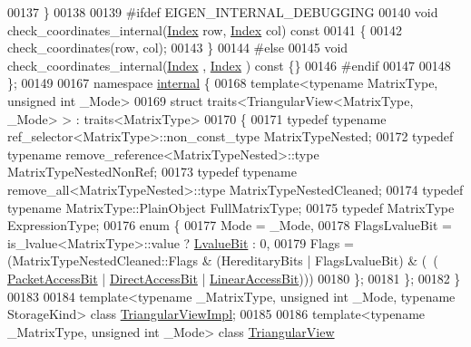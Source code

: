\begin{DoxyCode}
00137     \}
00138 
00139 \textcolor{preprocessor}{    #ifdef EIGEN\_INTERNAL\_DEBUGGING}
00140     \textcolor{keywordtype}{void} check\_coordinates\_internal(\hyperlink{group___core___module_a554f30542cc2316add4b1ea0a492ff02}{Index} row, \hyperlink{group___core___module_a554f30542cc2316add4b1ea0a492ff02}{Index} col)\textcolor{keyword}{ const}
00141 \textcolor{keyword}{    }\{
00142       check\_coordinates(row, col);
00143     \}
00144 \textcolor{preprocessor}{    #else}
00145     \textcolor{keywordtype}{void} check\_coordinates\_internal(\hyperlink{group___core___module_a554f30542cc2316add4b1ea0a492ff02}{Index} , \hyperlink{group___core___module_a554f30542cc2316add4b1ea0a492ff02}{Index} )\textcolor{keyword}{ const }\{\}
00146 \textcolor{preprocessor}{    #endif}
00147 
00148 \};
00149 
00167 \textcolor{keyword}{namespace }\hyperlink{namespaceinternal}{internal} \{
00168 \textcolor{keyword}{template}<\textcolor{keyword}{typename} MatrixType, \textcolor{keywordtype}{unsigned} \textcolor{keywordtype}{int} \_Mode>
00169 \textcolor{keyword}{struct }traits<TriangularView<MatrixType, \_Mode> > : traits<MatrixType>
00170 \{
00171   \textcolor{keyword}{typedef} \textcolor{keyword}{typename} ref\_selector<MatrixType>::non\_const\_type MatrixTypeNested;
00172   \textcolor{keyword}{typedef} \textcolor{keyword}{typename} remove\_reference<MatrixTypeNested>::type MatrixTypeNestedNonRef;
00173   \textcolor{keyword}{typedef} \textcolor{keyword}{typename} remove\_all<MatrixTypeNested>::type MatrixTypeNestedCleaned;
00174   \textcolor{keyword}{typedef} \textcolor{keyword}{typename} MatrixType::PlainObject FullMatrixType;
00175   \textcolor{keyword}{typedef} MatrixType ExpressionType;
00176   \textcolor{keyword}{enum} \{
00177     Mode = \_Mode,
00178     FlagsLvalueBit = is\_lvalue<MatrixType>::value ? \hyperlink{group__flags_gae2c323957f20dfdc6cb8f44428eaec1a}{LvalueBit} : 0,
00179     Flags = (MatrixTypeNestedCleaned::Flags & (HereditaryBits | FlagsLvalueBit) & (~(
      \hyperlink{group__flags_ga1a306a438e1ab074e8be59512e887b9f}{PacketAccessBit} | \hyperlink{group__flags_gabf1e9d0516a933445a4c307ad8f14915}{DirectAccessBit} | 
      \hyperlink{group__flags_ga4b983a15d57cd55806df618ac544d09e}{LinearAccessBit})))
00180   \};
00181 \};
00182 \}
00183 
00184 \textcolor{keyword}{template}<\textcolor{keyword}{typename} \_MatrixType, \textcolor{keywordtype}{unsigned} \textcolor{keywordtype}{int} \_Mode, \textcolor{keyword}{typename} StorageKind> \textcolor{keyword}{class }
      \hyperlink{class_eigen_1_1_triangular_view_impl}{TriangularViewImpl};
00185 
00186 \textcolor{keyword}{template}<\textcolor{keyword}{typename} \_MatrixType, \textcolor{keywordtype}{unsigned} \textcolor{keywordtype}{int} \_Mode> \textcolor{keyword}{class }\hyperlink{group___core___module_class_eigen_1_1_triangular_view}{TriangularView}

\end{DoxyCode}
